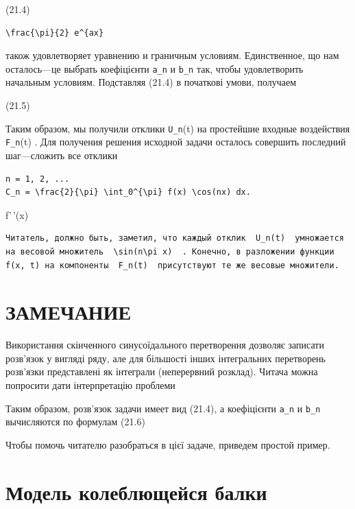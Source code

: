 \documentclass[
  ukrainian,
]{article}
\begin{document}
(21.4)

\begin{verbatim}
\frac{\pi}{2} e^{ax}
\end{verbatim}

також удовлетворяет уравнению и граничным условиям. Единственное, що нам
осталось---це выбрать коефіцієнти \texttt{a\_n} и \texttt{b\_n} так,
чтобы удовлетворить начальным условиям. Подставляя (21.4) в початкові
умови, получаем

(21.5)

Таким образом, мы получили отклики \texttt{U\_n}(t) на простейшие
входные воздействия \texttt{F\_n}(t) . Для получения решения исходной
задачи осталось совершить последний шаг---сложить все отклики

\begin{verbatim}
n = 1, 2, ...
C_n = \frac{2}{\pi} \int_0^{\pi} f(x) \cos(nx) dx.
\end{verbatim}

f'\,'(x)

\begin{verbatim}
Читатель, должно быть, заметил, что каждый отклик  U_n(t)  умножается на весовой множитель  \sin(n\pi x)  . Конечно, в разложении функции f(x, t) на компоненты  F_n(t)  присутствуют те же весовые множители.
\end{verbatim}

\section{ЗАМЕЧАНИЕ}\label{ux437ux430ux43cux435ux447ux430ux43dux438ux435}

Використання скінченного синусоїдального перетворення дозволяє записати
розв'язок у вигляді ряду, але для більшості інших інтегральних
перетворень розв'язки представлені як інтеграли (неперервний розклад).
Читача можна попросити дати інтерпретацію проблеми

Таким образом, розв'язок задачи имеет вид (21.4), а коефіцієнти
\texttt{a\_n} и \texttt{b\_n} вычисляются по формулам (21.6)

Чтобы помочь читателю разобраться в цієї задаче, приведем простой
пример.

\section{Модель колеблющейся
балки}\label{ux43cux43eux434ux435ux43bux44c-ux43aux43eux43bux435ux431ux43bux44eux449ux435ux439ux441ux44f-ux431ux430ux43bux43aux438}
\end{document}
